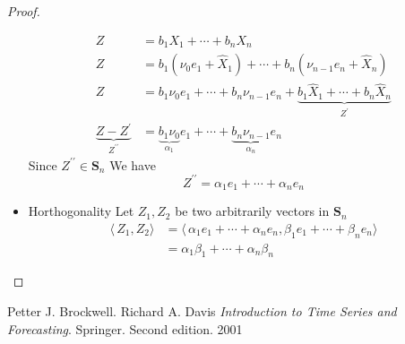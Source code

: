 \documentclass[11pt, oneside]{article}   	%
\begin{document}
\begin{proof}
\begin{itemize}
\begin{equation}
\begin{split}
Z &= b_{1}X_{1} + \cdots + b_{n}X_{n}\\
Z&=b_{1}(\nu_{0}e_{1} + \hat{X}_{1}) + \cdots + b_{n}(\nu_{n-1}e_{n} + \hat{X}_{n})\\
Z&=b_{1}\nu_{0}e_{1}  + \cdots + b_{n}\nu_{n-1}e_{n} + \underbrace{b_{1}\hat{X}_{1} + \cdots + b_{n}\hat{X}_{n}}_{Z^{\prime}}\\
\underbrace{Z-Z^{\prime}}_{Z^{\prime\prime}}&=\underbrace{b_{1}\nu_{0}}_{\alpha_{1}}e_{1}  + \cdots + \underbrace{b_{n}\nu_{n-1}}_{\alpha_{n}}e_{n} 
\end{split}
\end{equation} 
Since $Z^{\prime\prime} \in \textbf{S}_{n}$
We have 
\begin{equation}
Z^{\prime\prime} = \alpha_{1}e_{1}  + \cdots + \alpha_{n}e_{n} 
\end{equation}

\item Horthogonality
Let $Z_{1}, Z_{2}$ be two arbitrarily vectors in $\textbf{S}_{n}$
\begin{equation}
\begin{split}
\langle\,Z_{1},Z_{2}\rangle & = \langle\,\alpha_{1}e_{1}  + \cdots + \alpha_{n}e_{n} ,\beta_{1}e_{1}  + \cdots + \beta_{n}e_{n} \rangle\\
&=\alpha_{1}\beta_{1} + \cdots+ \alpha_{n}\beta_{n}
\end{split}
\end{equation}
\end{itemize}
\end{proof}


\begin{thebibliography}{9}
Petter J. Brockwell. Richard A. Davis
\textit{Introduction to Time Series and Forecasting}. 
Springer. Second edition. 2001
 
\end{thebibliography}
\end{document}
